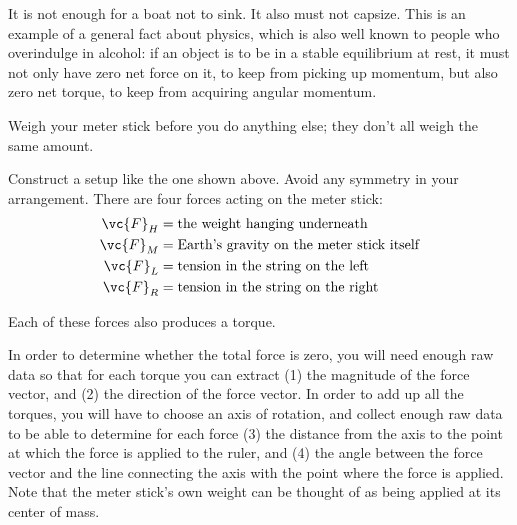 \label{lab:torque}

\apparatus
{}


\introduction

It is not enough for a boat not to sink.  It also must not
capsize.  This is an example of a general fact about
physics, which is also well known to people who overindulge
in alcohol: if an object is to be in a stable equilibrium at
rest, it must not only have zero net force on it, to keep
from picking up momentum, but also zero net torque, to keep
from acquiring angular momentum.


\observations

Weigh your meter stick before you do anything else; they don't all
weigh the same amount.

Construct a setup like the one shown above.  Avoid any
symmetry in your arrangement.  There are four forces
acting on the meter stick:
\begin{align*}
       \vc{F}_H &=    \text{the weight hanging underneath}  \\
       \vc{F}_M &=    \text{Earth's gravity on the meter stick itself}  \\
       \vc{F}_L &=    \text{tension in the string on the left}  \\
       \vc{F}_R &=    \text{tension in the string on the right} 
\end{align*}

Each of these forces also produces a torque.

In order to determine whether the total force is zero, you
will need enough raw data so that for each torque you can
extract (1) the magnitude of the force vector, and (2) the
direction of the force vector.  In order to add up all the
torques, you will have to choose an axis of rotation, and
collect enough raw data to be able to determine for each
force (3) the distance from the axis to the point at which
the force is applied to the ruler, and (4) the angle between
the force vector and the line connecting the axis with the
point where the force is applied.  Note that the meter
stick's own weight can be thought of as being applied
at its center of mass.


